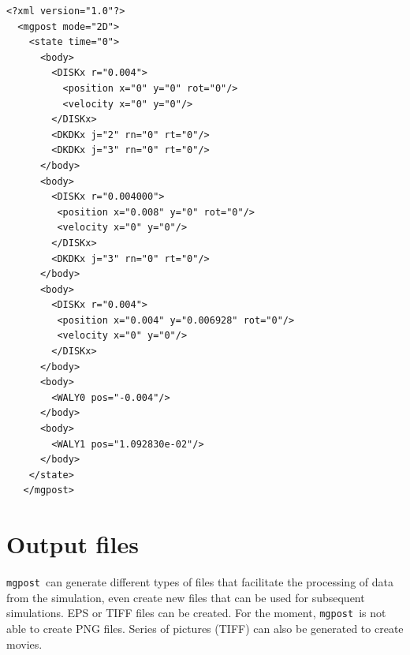 \documentclass{simpledoc}
\newcommand{\mgpost}{\texttt{mgpost}\ }
\begin{document}
\begin{lstlisting}[style=mgpdata]
  <?xml version="1.0"?>
  <mgpost mode="2D">
    <state time="0">
      <body>
        <DISKx r="0.004">
          <position x="0" y="0" rot="0"/>
          <velocity x="0" y="0"/>
        </DISKx>
        <DKDKx j="2" rn="0" rt="0"/>
        <DKDKx j="3" rn="0" rt="0"/>
      </body>
      <body>
        <DISKx r="0.004000">
         <position x="0.008" y="0" rot="0"/>
         <velocity x="0" y="0"/>
        </DISKx>
        <DKDKx j="3" rn="0" rt="0"/>
      </body>
      <body>
        <DISKx r="0.004">
         <position x="0.004" y="0.006928" rot="0"/>
         <velocity x="0" y="0"/>
        </DISKx>
      </body>
      <body>
        <WALY0 pos="-0.004"/>
      </body>
      <body>
        <WALY1 pos="1.092830e-02"/>
      </body>
    </state>
   </mgpost>
\end{lstlisting}

\section {Output files}
        
\mgpost can generate different types of files 
that facilitate the processing of data from the simulation, even 
create new files that can be used for subsequent simulations. 
EPS or TIFF files can be created. For the moment, \mgpost is not able to create PNG files.
Series of pictures (TIFF) can also be generated to create movies.
 
\end{document}

